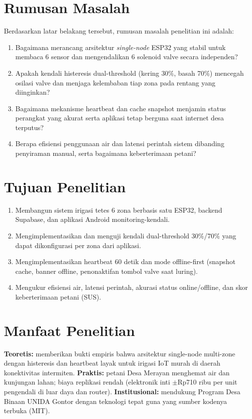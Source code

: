 \documentclass[12pt,a4paper,oneside]{report}
\begin{document}
\section{Rumusan Masalah}
Berdasarkan latar belakang tersebut, rumusan masalah penelitian ini adalah:
\begin{enumerate}[leftmargin=1.2cm]
\item Bagaimana merancang arsitektur \textit{single-node} ESP32 yang stabil untuk membaca 6 sensor dan mengendalikan 6 solenoid valve secara independen?
\item Apakah kendali histeresis dual-threshold (kering 30\%, basah 70\%) mencegah osilasi valve dan menjaga kelembaban tiap zona pada rentang yang diinginkan?
\item Bagaimana mekanisme heartbeat dan cache snapshot menjamin status perangkat yang akurat serta aplikasi tetap berguna saat internet desa terputus?
\item Berapa efisiensi penggunaan air dan latensi perintah sistem dibanding penyiraman manual, serta bagaimana keberterimaan petani?
\end{enumerate}

\section{Tujuan Penelitian}
\begin{enumerate}[leftmargin=1.2cm]
\item Membangun sistem irigasi tetes 6 zona berbasis satu ESP32, backend Supabase, dan aplikasi Android monitoring-kendali.
\item Mengimplementasikan dan menguji kendali dual-threshold 30\%/70\% yang dapat dikonfigurasi per zona dari aplikasi.
\item Mengimplementasikan heartbeat 60 detik dan mode offline-first (snapshot cache, banner offline, penonaktifan tombol valve saat luring).
\item Mengukur efisiensi air, latensi perintah, akurasi status online/offline, dan skor keberterimaan petani (SUS).
\end{enumerate}

\section{Manfaat Penelitian}
\textbf{Teoretis:} memberikan bukti empiris bahwa arsitektur single-node multi-zone dengan histeresis dan heartbeat layak untuk irigasi IoT murah di daerah konektivitas intermiten. \textbf{Praktis:} petani Desa Merayan menghemat air dan kunjungan lahan; biaya replikasi rendah (elektronik inti $\pm$Rp710 ribu per unit pengendali di luar daya dan router). \textbf{Institusional:} mendukung Program Desa Binaan UNIDA Gontor dengan teknologi tepat guna yang sumber kodenya terbuka (MIT).
\end{document}
